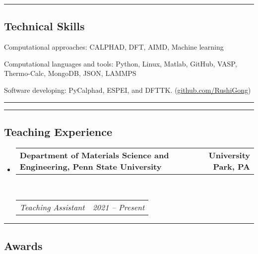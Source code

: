 \documentclass[10pt,letterpaper]{article}
\makeatletter
\newenvironment{indentsection}[1]%
{\begin{list}{}%
  {\setlength{\leftmargin}{#1}}%
  \item[]%
}
{\end{list}}
\newcommand{\headerrow}[2]
{\begin{tabular*}{\linewidth}{l@{\extracolsep{\fill}}r}
  #1 &
  #2 \\
\end{tabular*}}
\makeatother
\begin{document}
\hrule
\vspace{-0.6em}
\subsection*{Technical Skills}

\begin{indentsection}{\parindent}
\begin{description*}
  \item[Computational approaches:]
  CALPHAD, DFT, AIMD, Machine learning
  \item[Computational languages and tools:]
  Python, Linux, Matlab, GitHub, VASP, Thermo-Calc, MongoDB, JSON, LAMMPS
  \item [Software developing:]
  PyCalphad, ESPEI, and DFTTK. (\href{https://github.com/RushiGong}{github.com/RushiGong})
\end{description*}
\end{indentsection}

\hrule
\pagebreak

\hrule
\vspace{-0.6em}
\subsection*{Teaching Experience}

\renewcommand\labelitemiii{$\circ$}
\begin{itemize}
    \parskip=0.1em

    \item
    \headerrow
    {\textbf{Department of Materials Science and Engineering, Penn State University}}
    {\textbf{University Park, PA}}
    \\
    \headerrow
    {\emph{Teaching Assistant}}
    {\emph{2021 -- Present}}
\end{itemize}

\hrule
\vspace{-0.6em}
\subsection*{Awards}
\end{document}
